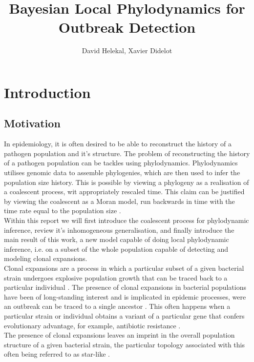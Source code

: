 \documentclass{report}
\title{Bayesian Local Phylodynamics for Outbreak Detection}
\author{David Helekal, Xavier Didelot}
\theoremstyle{definition}
\begin{document}
\maketitle
\newpage
\tableofcontents
\newpage
\chapter{Introduction}
\section{Motivation}
In epidemiology, it is often desired to be able to reconstruct the history of a pathogen population and it's structure. The problem of reconstructing the history of a pathogen population can be tackles using phylodynamics. Phylodynamics utilises genomic data to assemble phylogenies, which are then used to infer the population size history. This is possible by viewing a phylogeny as a realisation of a coalescent process, wit appropriately rescaled time. This claim can be justified by viewing the coalescent as a Moran model, run backwards in time with the time rate equal to the population size \cite{griffiths_sampling_1994}.\\
Within this report we will first introduce the coalescent process for phylodynamic inference, review it's inhomogeneous generalisation, and finally introduce the main result of this work, a new model capable of doing local phylodynamic inference, i.e. on a subset of the whole population capable of detecting and modeling clonal expansions.\\
Clonal expansions are a process in which a particular subset of a given bacterial strain undergoes explosive population growth that can be traced back to a particular individual \cite{smith_how_1993}. The presence of clonal expansions in bacterial populations have been of long-standing interest and is implicated in epidemic processes, were an outbreak can be traced to a single ancestor \cite{smith_how_1993,spratt_displaying_2004,fraser_neutral_2005,ledda_re-emergence_2017}. This often happens when a particular strain or individual obtains a variant of a particular gene that confers evolutionary advantage, for example, antibiotic resistance \cite{holden_genomic_2013,hsu_evolutionary_2015, ledda_re-emergence_2017}.\\
The presence of clonal expansions leaves an imprint in the overall population structure of a given bacterial strain, the particular topology associated with this often being referred to as star-like \cite{smith_how_1993,spratt_displaying_2004}.
\end{document}
